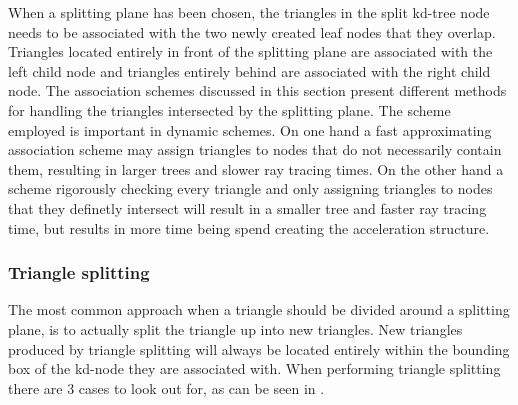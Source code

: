 When a splitting plane has been chosen, the triangles in the split
kd-tree node needs to be associated with the two newly created leaf
nodes that they overlap. Triangles located entirely in front of the
splitting plane are associated with the left child node and triangles
entirely behind are associated with the right child node. The
association schemes discussed in this section present different
methods for handling the triangles intersected by the splitting
plane. The scheme employed is important in dynamic schemes. On one
hand a fast approximating association scheme may assign triangles to
nodes that do not necessarily contain them, resulting in larger trees
and slower ray tracing times. On the other hand a scheme rigorously
checking every triangle and only assigning triangles to nodes that
they definetly intersect will result in a smaller tree and faster ray
tracing time, but results in more time being spend creating the
acceleration structure.





\subsubsection{Triangle splitting}


The most common approach when a triangle should be divided around a
splitting plane, is to actually split the triangle up into new
triangles. New triangles produced by triangle splitting will always be
located entirely within the bounding box of the kd-node they are
associated with. When performing triangle splitting there are 3 cases
to look out for, as can be seen in .

